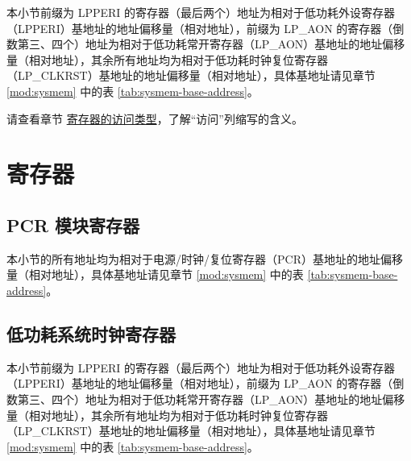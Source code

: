 \documentclass[main\_\_CN.tex]{subfiles}
\begin{document}
本小节前缀为 LPPERI 的寄存器（最后两个）地址为相对于低功耗外设寄存器（LPPERI）基地址的地址偏移量（相对地址），前缀为 LP\_AON 的寄存器（倒数第三、四个）地址为相对于低功耗常开寄存器（LP\_AON）基地址的地址偏移量（相对地址），其余所有地址均为相对于低功耗时钟复位寄存器（LP\_CLKRST）基地址的地址偏移量（相对地址），具体基地址请见章节 \ref{mod:sysmem} \textit{} 中的表 \ref{tab:sysmem-base-address}。

请查看章节 \hyperref[glossary-access-types]{寄存器的访问类型}，了解“访问”列缩写的含义。






\clearpage
\section{寄存器}

\subsection{PCR 模块寄存器}


本小节的所有地址均为相对于电源/时钟/复位寄存器（PCR）基地址的地址偏移量（相对地址），具体基地址请见章节 \ref{mod:sysmem} \textit{} 中的表 \ref{tab:sysmem-base-address}。





\subsection{低功耗系统时钟寄存器}


本小节前缀为 LPPERI 的寄存器（最后两个）地址为相对于低功耗外设寄存器（LPPERI）基地址的地址偏移量（相对地址），前缀为 LP\_AON 的寄存器（倒数第三、四个）地址为相对于低功耗常开寄存器（LP\_AON）基地址的地址偏移量（相对地址），其余所有地址均为相对于低功耗时钟复位寄存器（LP\_CLKRST）基地址的地址偏移量（相对地址），具体基地址请见章节 \ref{mod:sysmem} \textit{} 中的表 \ref{tab:sysmem-base-address}。



\end{document}
